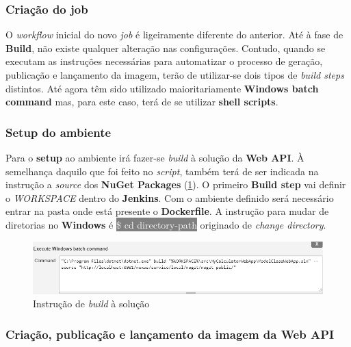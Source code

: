 \subsubsection{Criação do job}

\hspace{1cm}O \textit{workflow} inicial do novo \textit{job} é ligeiramente diferente do anterior. Até à fase de \textbf{Build}, não existe qualquer alteração nas configurações. Contudo, quando se executam as instruções necessárias para automatizar o processo de geração, publicação e lançamento da imagem, terão de utilizar-se dois tipos de \textit{build steps} distintos. Até agora têm sido utilizado maioritariamente \textbf{Windows batch command} mas, para este caso, terá de se utilizar \textbf{shell scripts}. 

\subsubsection{Setup do ambiente}

\hspace{1cm}Para o \textbf{setup} ao ambiente irá fazer-se \textit{build} à solução da \textbf{Web API}. À semelhança daquilo que foi feito no \textit{script}, também terá de ser indicada na instrução a \textit{source} dos \textbf{NuGet Packages} (\ref{Fig:Fig73}). O primeiro \textbf{Build step} vai definir o \textit{WORKSPACE} dentro do \textbf{Jenkins}. Com o ambiente definido será necessário entrar na pasta onde está presente o \textbf{Dockerfile}. A instrução para mudar de diretorias no \textbf{Windows} é \colorbox{gray}{\textcolor{white}{\$ cd directory-path}} originado de \textit{change directory}. 

\begin{figure}[hbt!]
\centering
\includegraphics[width=0.9\linewidth]{Cap5/JenkinsBuildModelClassWebApp.png}
\caption{Instrução de \textit{build} à solução}
\label{Fig:Fig73}
\end{figure}

\subsubsection{Criação, publicação e lançamento da imagem da Web API}

